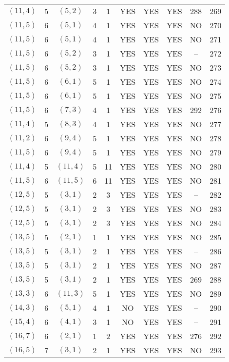 \begin{longtable}{|c|c|c|c|c|c|c|c|c|c|}
$(11, 4)$ & 5 & $(5, 2)$ & 3 & 1 & YES & YES & YES & 288 & 269\\
$(11, 5)$ & 6 & $(5, 1)$ & 4 & 1 & YES & YES & YES & NO & 270\\
$(11, 5)$ & 6 & $(5, 1)$ & 4 & 1 & YES & YES & YES & NO & 271\\
$(11, 5)$ & 6 & $(5, 2)$ & 3 & 1 & YES & YES & YES & -- & 272\\
$(11, 5)$ & 6 & $(5, 2)$ & 3 & 1 & YES & YES & YES & NO & 273\\
$(11, 5)$ & 6 & $(6, 1)$ & 5 & 1 & YES & YES & YES & NO & 274\\
$(11, 5)$ & 6 & $(6, 1)$ & 5 & 1 & YES & YES & YES & NO & 275\\
$(11, 5)$ & 6 & $(7, 3)$ & 4 & 1 & YES & YES & YES & 292 & 276\\
$(11, 4)$ & 5 & $(8, 3)$ & 4 & 1 & YES & YES & YES & NO & 277\\
$(11, 2)$ & 6 & $(9, 4)$ & 5 & 1 & YES & YES & YES & NO & 278\\
$(11, 5)$ & 6 & $(9, 4)$ & 5 & 1 & YES & YES & YES & NO & 279\\
$(11, 4)$ & 5 & $(11, 4)$ & 5 & 11 & YES & YES & YES & NO & 280\\
$(11, 5)$ & 6 & $(11, 5)$ & 6 & 11 & YES & YES & YES & NO & 281\\
$(12, 5)$ & 5 & $(3, 1)$ & 2 & 3 & YES & YES & YES & -- & 282\\
$(12, 5)$ & 5 & $(3, 1)$ & 2 & 3 & YES & YES & YES & NO & 283\\
$(12, 5)$ & 5 & $(3, 1)$ & 2 & 3 & YES & YES & YES & NO & 284\\
$(13, 5)$ & 5 & $(2, 1)$ & 1 & 1 & YES & YES & YES & NO & 285\\
$(13, 5)$ & 5 & $(3, 1)$ & 2 & 1 & YES & YES & YES & -- & 286\\
$(13, 5)$ & 5 & $(3, 1)$ & 2 & 1 & YES & YES & YES & NO & 287\\
$(13, 5)$ & 5 & $(3, 1)$ & 2 & 1 & YES & YES & YES & 269 & 288\\
$(13, 3)$ & 6 & $(11, 3)$ & 5 & 1 & YES & YES & YES & NO & 289\\
$(14, 3)$ & 6 & $(5, 1)$ & 4 & 1 & NO & YES & YES & -- & 290\\
$(15, 4)$ & 6 & $(4, 1)$ & 3 & 1 & NO & YES & YES & -- & 291\\
$(16, 7)$ & 6 & $(2, 1)$ & 1 & 2 & YES & YES & YES & 276 & 292\\
$(16, 5)$ & 7 & $(3, 1)$ & 2 & 1 & YES & YES & YES & NO & 293\\

\end{longtable}
